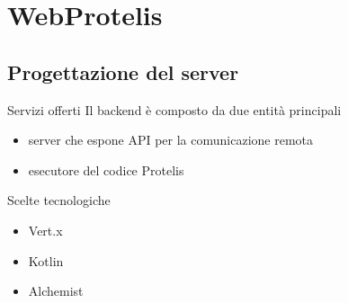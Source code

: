 \section{WebProtelis}

  \subsection{Progettazione del server}
    \begin{frame}{\insertsectionhead}{\insertsubsectionhead}

      \begin{block}{Servizi offerti}
        Il backend è composto da due entità principali
        \begin{itemize}
          \item server che espone API per la comunicazione remota
          \item esecutore del codice Protelis
        \end{itemize}
      \end{block}

      \begin{block}{Scelte tecnologiche}
        \begin{itemize}
          \item Vert.x      %
          \item Kotlin      %
          \item Alchemist   %
        \end{itemize}
      \end{block}
    \end{frame}

